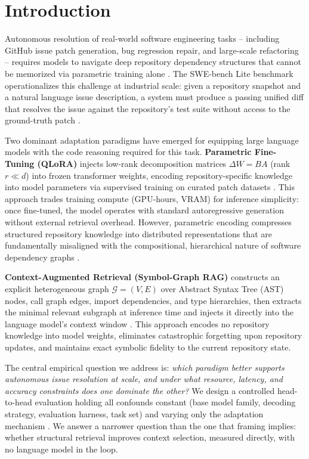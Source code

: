 \documentclass[10pt,twocolumn,letterpaper]{article}
\begin{document}
\section{Introduction}


Autonomous resolution of real-world software engineering tasks -- including GitHub issue patch generation, bug regression repair, and large-scale refactoring -- requires models to navigate deep repository dependency structures that cannot be memorized via parametric training alone \cite{arxiv_2405_01543,arxiv_2501_02842}. The SWE-bench Lite benchmark operationalizes this challenge at industrial scale: given a repository snapshot and a natural language issue description, a system must produce a passing unified diff that resolves the issue against the repository's test suite without access to the ground-truth patch \cite{arxiv_2203_02155}.

Two dominant adaptation paradigms have emerged for equipping large language models with the code reasoning required for this task. \textbf{Parametric Fine-Tuning (QLoRA)} injects low-rank decomposition matrices $\Delta W = BA$ (rank $r \ll d$) into frozen transformer weights, encoding repository-specific knowledge into model parameters via supervised training on curated patch datasets \cite{arxiv_2305_18290,arxiv_2208_14227}. This approach trades training compute (GPU-hours, VRAM) for inference simplicity: once fine-tuned, the model operates with standard autoregressive generation without external retrieval overhead. However, parametric encoding compresses structured repository knowledge into distributed representations that are fundamentally misaligned with the compositional, hierarchical nature of software dependency graphs \cite{arxiv_2406_00584}.

\textbf{Context-Augmented Retrieval (Symbol-Graph RAG)} constructs an explicit heterogeneous graph $\mathcal{G} = (V, E)$ over Abstract Syntax Tree (AST) nodes, call graph edges, import dependencies, and type hierarchies, then extracts the minimal relevant subgraph at inference time and injects it directly into the language model's context window \cite{crossref_10_1145_3689096_3689462,crossref_10_18653_v1_2026_findings_acl_1933}. This approach encodes no repository knowledge into model weights, eliminates catastrophic forgetting upon repository updates, and maintains exact symbolic fidelity to the current repository state.

The central empirical question we address is: \textit{which paradigm better supports autonomous issue resolution at scale, and under what resource, latency, and accuracy constraints does one dominate the other?} We design a controlled head-to-head evaluation holding all confounds constant (base model family, decoding strategy, evaluation harness, task set) and varying only the adaptation mechanism \cite{arxiv_2203_11171}. We answer a narrower question than the one that framing implies: whether structural retrieval improves context selection, measured directly, with no language model in the loop.
\end{document}
